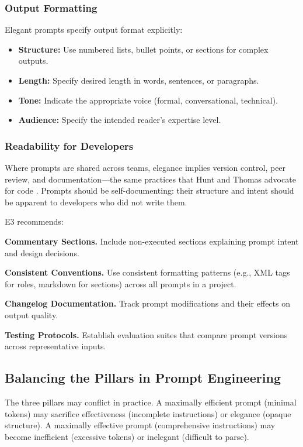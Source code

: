 \documentclass[11pt,a4paper]{article}
\begin{document}
\subsubsection{Output Formatting}

Elegant prompts specify output format explicitly:

\begin{itemize}[leftmargin=2em]
    \item \textbf{Structure:} Use numbered lists, bullet points, or sections for complex outputs.
    \item \textbf{Length:} Specify desired length in words, sentences, or paragraphs.
    \item \textbf{Tone:} Indicate the appropriate voice (formal, conversational, technical).
    \item \textbf{Audience:} Specify the intended reader's expertise level.
\end{itemize}

\subsubsection{Readability for Developers}

Where prompts are shared across teams, elegance implies version control, peer review, and documentation---the same practices that Hunt and Thomas advocate for code \cite{hunt1999pragmatic}. Prompts should be self-documenting: their structure and intent should be apparent to developers who did not write them.

E3 recommends:

\textbf{Commentary Sections.} Include non-executed sections explaining prompt intent and design decisions.

\textbf{Consistent Conventions.} Use consistent formatting patterns (e.g., XML tags for roles, markdown for sections) across all prompts in a project.

\textbf{Changelog Documentation.} Track prompt modifications and their effects on output quality.

\textbf{Testing Protocols.} Establish evaluation suites that compare prompt versions across representative inputs.

\subsection{Balancing the Pillars in Prompt Engineering}

The three pillars may conflict in practice. A maximally efficient prompt (minimal tokens) may sacrifice effectiveness (incomplete instructions) or elegance (opaque structure). A maximally effective prompt (comprehensive instructions) may become inefficient (excessive tokens) or inelegant (difficult to parse).
\end{document}

